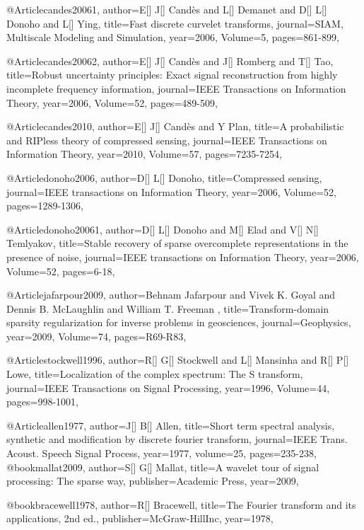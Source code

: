 {@Article{candes20061,
  author={E[] J[] Cand\`{e}s and L[] Demanet and D[] L[] Donoho and L[] Ying},
  title={Fast discrete curvelet transforms},
  journal={SIAM, Multiscale Modeling and Simulation},
  year=2006,
  Volume=5,
  pages={861-899},
}

@Article{candes20062,
  author={E[] J[] Cand\`{e}s and J[] Romberg and T[] Tao},
  title={Robust uncertainty principles: Exact signal reconstruction from highly incomplete frequency information},
  journal={IEEE Transactions on Information Theory},
  year=2006,
  Volume=52,
  pages={489-509},
}

@Article{candes2010,
  author={E[] J[] Cand\`{e}s and Y Plan},
  title={A probabilistic and RIPless theory of compressed sensing},
  journal={IEEE Transactions on Information Theory},
  year=2010,
  Volume=57,
  pages={7235-7254},
}


@Article{donoho2006,
  author={D[] L[] Donoho},
  title={Compressed sensing},
  journal={IEEE transactions on Information Theory},
  year=2006,
  Volume=52,
  pages={1289-1306},
}

@Article{donoho20061,
  author={D[] L[] Donoho and M[] Elad and V[] N[] Temlyakov},
  title={Stable recovery of sparse overcomplete representations in the presence of noise},
  journal={IEEE transactions on Information Theory},
  year=2006,
  Volume=52,
  pages={6-18},
}

@Article{jafarpour2009,
  author={Behnam Jafarpour and Vivek K. Goyal and Dennis B. McLaughlin and William T. Freeman },
  title={Transform-domain sparsity regularization for inverse problems in
geosciences},
  journal={Geophysics},
  year=2009,
  Volume=74,
  pages={R69-R83},
}

@Article{stockwell1996,
  author={R[] G[] Stockwell and L[] Mansinha and R[] P[] Lowe},
  title={Localization of the complex spectrum: The S transform},
  journal={IEEE Transactions on Signal Processing},
  year=1996,
  Volume=44,
  pages={998-1001},
}

@Article{allen1977,
  author={J[] B[] Allen},
  title={Short term spectral analysis, synthetic and modification by discrete fourier transform},
  journal={IEEE Trans. Acoust. Speech Signal Process},
  year=1977,
  volume=25,
  pages={235-238},
}
@book{mallat2009,
  author={S[] G[] Mallat},
  title={A wavelet tour of signal processing: The sparse way},
  publisher={Academic Press},
  year=2009,
}

@book{bracewell1978,
  author={R[] Bracewell},
  title={The Fourier transform and its applications, 2nd ed.},
  publisher={McGraw-HillInc},
  year=1978,
}

}
